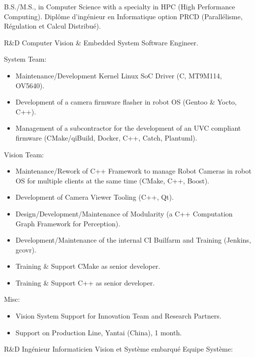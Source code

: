 \documentclass{article}
\begin{document}

\begin{llist}
 
 {
B.S./M.S., in Computer Science with a specialty in HPC (High Performance Computing).
} {
Dipl\^{o}me d'ing\'{e}nieur en Informatique option PRCD (Parall\'{e}lisme,
R\'{e}gulation et Calcul Distribu\'{e}).
}

{}
{}
\vspace{-0.33cm}

 {
R\&D Computer Vision \& Embedded System Software Engineer.\\
\vspace{-0.33cm}

System Team:
\begin{itemize}
\item Maintenance/Development Kernel Linux SoC Driver (C, MT9M114, OV5640).
\item Development of a camera firmware flasher in robot OS (Gentoo \& Yocto, C++).
\item Management of a subcontractor for the development of an UVC compliant firmware (CMake/qiBuild, Docker, C++, Catch, Plantuml).
\end{itemize}
Vision Team:
\begin{itemize}
\item Maintenance/Rework of C++ Framework to manage Robot Cameras in robot OS for multiple clients at the same time (CMake, C++, Boost).
\item Development of Camera Viewer Tooling (C++, Qt).
\item Design/Development/Maintenance of Modularity (a C++ Computation Graph Framework for Perception).
\item Development/Maintenance of the internal CI Builfarm and Training (Jenkins,
 gcovr).
\item Training \& Support CMake as senior developer.
\item Training \& Support C++ as senior developer.
\end{itemize}
Misc:
\begin{itemize}
\item Vision System Support for Innovation Team and Research Partners.
\item Support on Production Line, Yantai (China), 1 month.
\end{itemize}
}{
R\&D Ing\'{e}nieur Informaticien Vision et Syst\`{e}me embarqu\'{e}
\vspace{-0.33cm}
Equipe Syst\`{e}me:

}
\end{llist}
\end{document}
